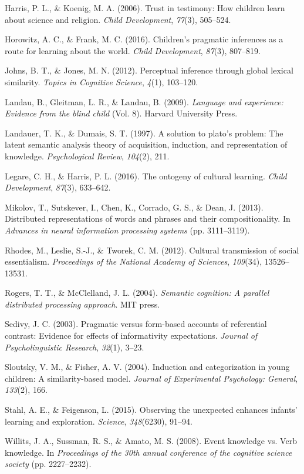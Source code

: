 \documentclass[10pt, letterpaper]{article}
\begin{document}
\leavevmode\hypertarget{ref-harris2006}{}%
Harris, P. L., \& Koenig, M. A. (2006). Trust in testimony: How children
learn about science and religion. \emph{Child Development},
\emph{77}(3), 505--524.

\leavevmode\hypertarget{ref-horowitz2016}{}%
Horowitz, A. C., \& Frank, M. C. (2016). Children's pragmatic inferences
as a route for learning about the world. \emph{Child Development},
\emph{87}(3), 807--819.

\leavevmode\hypertarget{ref-johns2012}{}%
Johns, B. T., \& Jones, M. N. (2012). Perceptual inference through
global lexical similarity. \emph{Topics in Cognitive Science},
\emph{4}(1), 103--120.

\leavevmode\hypertarget{ref-landau2009}{}%
Landau, B., Gleitman, L. R., \& Landau, B. (2009). \emph{Language and
experience: Evidence from the blind child} (Vol. 8). Harvard University
Press.

\leavevmode\hypertarget{ref-landauer1997}{}%
Landauer, T. K., \& Dumais, S. T. (1997). A solution to plato's problem:
The latent semantic analysis theory of acquisition, induction, and
representation of knowledge. \emph{Psychological Review}, \emph{104}(2),
211.

\leavevmode\hypertarget{ref-legare2016}{}%
Legare, C. H., \& Harris, P. L. (2016). The ontogeny of cultural
learning. \emph{Child Development}, \emph{87}(3), 633--642.

\leavevmode\hypertarget{ref-mikolov2013}{}%
Mikolov, T., Sutskever, I., Chen, K., Corrado, G. S., \& Dean, J.
(2013). Distributed representations of words and phrases and their
compositionality. In \emph{Advances in neural information processing
systems} (pp. 3111--3119).

\leavevmode\hypertarget{ref-rhodes2012}{}%
Rhodes, M., Leslie, S.-J., \& Tworek, C. M. (2012). Cultural
transmission of social essentialism. \emph{Proceedings of the National
Academy of Sciences}, \emph{109}(34), 13526--13531.

\leavevmode\hypertarget{ref-rogers2004}{}%
Rogers, T. T., \& McClelland, J. L. (2004). \emph{Semantic cognition: A
parallel distributed processing approach}. MIT press.

\leavevmode\hypertarget{ref-sedivy2003}{}%
Sedivy, J. C. (2003). Pragmatic versus form-based accounts of
referential contrast: Evidence for effects of informativity
expectations. \emph{Journal of Psycholinguistic Research}, \emph{32}(1),
3--23.

\leavevmode\hypertarget{ref-sloutsky2004}{}%
Sloutsky, V. M., \& Fisher, A. V. (2004). Induction and categorization
in young children: A similarity-based model. \emph{Journal of
Experimental Psychology: General}, \emph{133}(2), 166.

\leavevmode\hypertarget{ref-stahl2015}{}%
Stahl, A. E., \& Feigenson, L. (2015). Observing the unexpected enhances
infants' learning and exploration. \emph{Science}, \emph{348}(6230),
91--94.

\leavevmode\hypertarget{ref-willits2008}{}%
Willits, J. A., Sussman, R. S., \& Amato, M. S. (2008). Event knowledge
vs. Verb knowledge. In \emph{Proceedings of the 30th annual conference
of the cognitive science society} (pp. 2227--2232).


\end{document}
